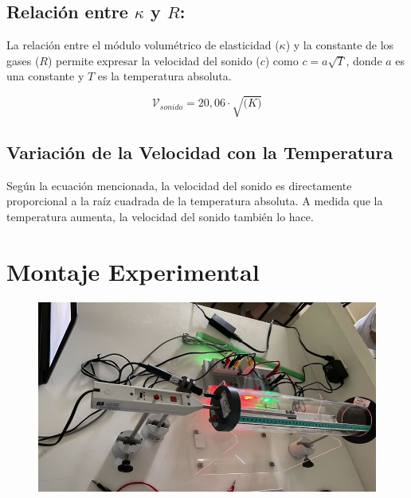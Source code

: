 \documentclass[twocolumn, 12pt]{article}
\begin{document}
\subsection{Relación entre $\kappa$ y $R$:}

La relación entre el módulo volumétrico de elasticidad
($\kappa$) y la constante de los gases ($R$) permite
expresar la velocidad del sonido ($c$) como $c =
    a\sqrt{T}$, donde $a$ es una constante y $T$ es la
temperatura absoluta.

\begin{equation}
    \mathcal{V}_{sonido} = 20,06 \cdot\sqrt{\mathcal(K)}
    \label{eq:velocidad_sonido_teorica}
\end{equation}

\subsection{Variación de la Velocidad con la Temperatura}

Según la ecuación mencionada, la velocidad del sonido es
directamente proporcional a la raíz cuadrada de la
temperatura absoluta. A medida que la temperatura aumenta,
la velocidad del sonido también lo hace.

\section{Montaje Experimental}

\begin{figure}[H]
    \includegraphics[width=\linewidth]{./Images/Imagen3.jpg}
    \caption{}
    \label{figure:me_1}
\end{figure}
\end{document}
